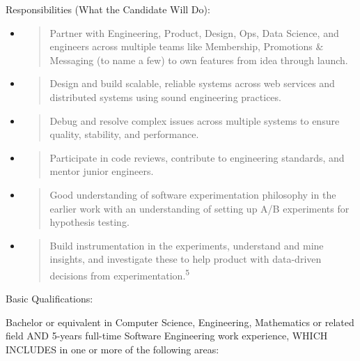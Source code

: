 \documentclass[12pt,a4paper]{article}
\begin{document}
Responsibilities (What the Candidate Will Do):

\begin{itemize}
\item
  \begin{quote}
  Partner with Engineering, Product, Design, Ops, Data Science, and
  engineers across multiple teams like Membership, Promotions \&
  Messaging (to name a few) to own features from idea through launch.
  \end{quote}
\item
  \begin{quote}
  Design and build scalable, reliable systems across web services and
  distributed systems using sound engineering practices.
  \end{quote}
\item
  \begin{quote}
  Debug and resolve complex issues across multiple systems to ensure
  quality, stability, and performance.
  \end{quote}
\item
  \begin{quote}
  Participate in code reviews, contribute to engineering standards, and
  mentor junior engineers.
  \end{quote}
\item
  \begin{quote}
  Good understanding of software experimentation philosophy in the
  earlier work with an understanding of setting up A/B experiments for
  hypothesis testing.
  \end{quote}
\item
  \begin{quote}
  Build instrumentation in the experiments, understand and mine
  insights, and investigate these to help product with data-driven
  decisions from experimentation.\textsuperscript{5}
  \end{quote}
\end{itemize}

Basic Qualifications:

Bachelor or equivalent in Computer Science, Engineering, Mathematics or
related field AND 5-years full-time Software Engineering work
experience, WHICH INCLUDES in one or more of the following areas:
\end{document}
